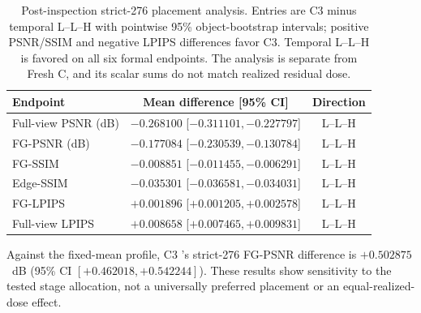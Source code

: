 \documentclass[times,twocolumn,final]{elsarticle}
\providecommand{\DIFadd}[1]{{\protect\color{blue} \sf #1}} %
\providecommand{\DIFaddbegin}{} %
\providecommand{\DIFaddend}{} %
\providecommand{\DIFaddFL}[1]{\DIFadd{#1}} %
\providecommand{\DIFaddbeginFL}{\DIFaddbegin} %
\providecommand{\DIFaddendFL}{\DIFaddend} %
\renewcommand{\DIFaddbeginFL}{}
\renewcommand{\DIFaddendFL}{}
\renewcommand{\DIFaddFL}[1]{#1}
\begin{document}
  \DIFaddbeginFL \begin{table}[t]
\DIFaddendFL \centering
  \DIFaddbeginFL \scriptsize
\DIFaddendFL \setlength{\tabcolsep}{4pt}
  \DIFaddbeginFL \caption{Post-inspection strict-276 placement analysis. Entries are C3 minus temporal L--L--H with pointwise 95\% object-bootstrap intervals; positive PSNR/SSIM and negative LPIPS differences favor C3. Temporal L--L--H is favored on all six formal endpoints. The analysis is separate from Fresh C, and its scalar sums do not match realized residual dose.}
\label{tab:temporal-placement}
\begin{tabular}{lcc}
\DIFaddendFL \toprule
  \DIFaddbeginFL \DIFaddFL{Endpoint }\DIFaddendFL &   \DIFaddbeginFL \DIFaddFL{Mean difference }[\DIFaddFL{95\% CI}] \DIFaddendFL &   \DIFaddbeginFL \DIFaddFL{Direction }\DIFaddendFL \\
\midrule
  \DIFaddbeginFL \DIFaddFL{Full-view PSNR (dB) }\DIFaddendFL &   \DIFaddbeginFL \DIFaddFL{$-0.268100$ }[\DIFaddFL{$-0.311101,-0.227797$}] \DIFaddendFL &   \DIFaddbeginFL \DIFaddFL{L--L--H }\\
\DIFaddFL{FG-PSNR (dB) }\DIFaddendFL &   \DIFaddbeginFL \DIFaddFL{$-0.177084$ }[\DIFaddFL{$-0.230539,-0.130784$}] \DIFaddendFL &   \DIFaddbeginFL \DIFaddFL{L--L--H }\DIFaddendFL \\
  \DIFaddbeginFL \DIFaddFL{FG-SSIM }\DIFaddendFL &   \DIFaddbeginFL \DIFaddFL{$-0.008851$ }[\DIFaddFL{$-0.011455,-0.006291$}] \DIFaddendFL &   \DIFaddbeginFL \DIFaddFL{L--L--H }\\
\DIFaddFL{Edge-SSIM }\DIFaddendFL &   \DIFaddbeginFL \DIFaddFL{$-0.035301$ }[\DIFaddFL{$-0.036581,-0.034031$}] \DIFaddendFL &   \DIFaddbeginFL \DIFaddFL{L--L--H }\DIFaddendFL \\
  \DIFaddbeginFL \DIFaddFL{FG-LPIPS }\DIFaddendFL &   \DIFaddbeginFL \DIFaddFL{$+0.001896$ }[\DIFaddFL{$+0.001205,+0.002578$}] \DIFaddendFL &   \DIFaddbeginFL \DIFaddFL{L--L--H }\\
\DIFaddFL{Full-view LPIPS }\DIFaddendFL &   \DIFaddbeginFL \DIFaddFL{$+0.008658$ }[\DIFaddFL{$+0.007465,+0.009831$}] \DIFaddendFL &   \DIFaddbeginFL \DIFaddFL{L--L--H }\DIFaddendFL \\
\bottomrule
\end{tabular}
  \DIFaddbegin \end{table}
\DIFaddend 

  \DIFaddbegin \DIFadd{Against the fixed-mean profile}\DIFaddend , C3  \DIFaddbegin \DIFadd{'s strict-276 FG-PSNR difference is $+0.502875$~dB (95\% CI $[+0.462018,+0.542244]$)}\DIFaddend . These results show   \DIFaddbegin \DIFadd{sensitivity to the tested stage allocation, not a universally preferred placement or an equal-realized-dose effect}\DIFaddend .
\end{document}
